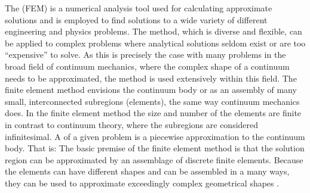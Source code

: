 
\label{sec:finite_element_method}
The  (FEM) is a numerical analysis tool
used for calculating approximate solutions and is employed to find
solutions to a wide variety of different engineering and physics
problems.
%
The method, which is diverse and flexible, can be applied to complex
problems where analytical solutions seldom exist or are too ``expensive''
to solve. As this is precisely the case with many problems in the broad
field of continuum mechanics, where the complex shape of a continuum
needs to be approximated, the method is used extensively within this
field.
%
The finite element method envisions the continuum body or
 as an assembly of many small,
interconnected subregions (elements), the same way continuum mechanics
does.
In the finite element method the size and number of the elements are
finite in contrast to continuum theory, where the subregions are
considered infinitesimal.
A  of a given problem is a
piecewise approximation to the continuum body. That is: The basic
premise of the finite element method is that the solution
region can be approximated by an assemblage of discrete finite
elements. Because the elements can have different shapes and can be
assembled in a many ways, they can be used to approximate exceedingly
complex geometrical shapes .

